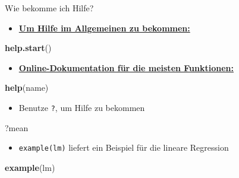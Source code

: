 \documentclass[ignorenonframetext,]{beamer}
\newenvironment{Shaded}{\begin{snugshade}}{\end{snugshade}}
\newcommand{\KeywordTok}[1]{\textcolor[rgb]{0.26,0.66,0.93}{\textbf{#1}}}
\newcommand{\NormalTok}[1]{\textcolor[rgb]{0.74,0.68,0.62}{#1}}
\providecommand{\tightlist}{%
  \setlength{\itemsep}{0pt}\setlength{\parskip}{0pt}}
\begin{document}
\begin{frame}[fragile]{Wie bekomme ich Hilfe?}
\protect\hypertarget{wie-bekomme-ich-hilfe}{}

\begin{itemize}
\tightlist
\item
  \href{http://itfeature.com/tag/how-to-get-help-in-r}{\textbf{Um Hilfe
  im Allgemeinen zu bekommen:}}
\end{itemize}

\begin{Shaded}
\begin{Highlighting}[]
\KeywordTok{help.start}\NormalTok{()}
\end{Highlighting}
\end{Shaded}

\begin{itemize}
\tightlist
\item
  \href{https://www.r-project.org/help.html}{\textbf{Online-Dokumentation
  für die meisten Funktionen:}}
\end{itemize}

\begin{Shaded}
\begin{Highlighting}[]
\KeywordTok{help}\NormalTok{(name)}
\end{Highlighting}
\end{Shaded}

\begin{itemize}
\tightlist
\item
  Benutze \texttt{?}, um Hilfe zu bekommen
\end{itemize}

\begin{Shaded}
\begin{Highlighting}[]
\NormalTok{?mean}
\end{Highlighting}
\end{Shaded}

\begin{itemize}
\tightlist
\item
  \texttt{example(lm)} liefert ein Beispiel für die lineare Regression
\end{itemize}

\begin{Shaded}
\begin{Highlighting}[]
\KeywordTok{example}\NormalTok{(lm)}
\end{Highlighting}
\end{Shaded}

\end{frame}
\end{document}
